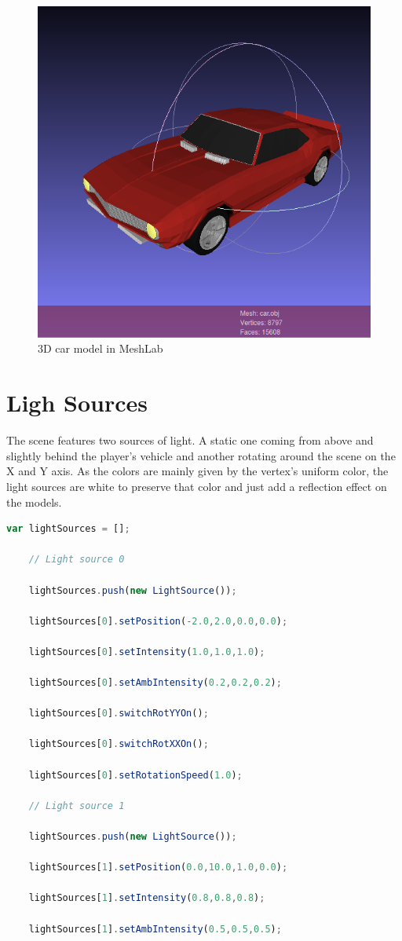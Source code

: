 \documentclass[english]{revdetua}
\begin{document}
\begin{figure}[h]
	\centering
	\includegraphics[width=\linewidth]{car_meshlab.png}  
	\caption{3D car model in MeshLab}
	\label{fig:car_meshlab}
\end{figure}

\section{Ligh Sources}
The scene features two sources of light. A static one coming from above and slightly behind the player's vehicle and another rotating around the scene on the X and Y axis. As the colors are mainly given by the vertex's uniform color, the light sources are white to preserve that color and just add a reflection effect on the models.

\begin{lstlisting}[language=JavaScript]
	var lightSources = [];

	// Light source 0

	lightSources.push(new LightSource());

	lightSources[0].setPosition(-2.0,2.0,0.0,0.0);

	lightSources[0].setIntensity(1.0,1.0,1.0);

	lightSources[0].setAmbIntensity(0.2,0.2,0.2);

	lightSources[0].switchRotYYOn();

	lightSources[0].switchRotXXOn();

	lightSources[0].setRotationSpeed(1.0);

	// Light source 1

	lightSources.push(new LightSource());

	lightSources[1].setPosition(0.0,10.0,1.0,0.0);

	lightSources[1].setIntensity(0.8,0.8,0.8);

	lightSources[1].setAmbIntensity(0.5,0.5,0.5);
\end{lstlisting}
\end{document}
